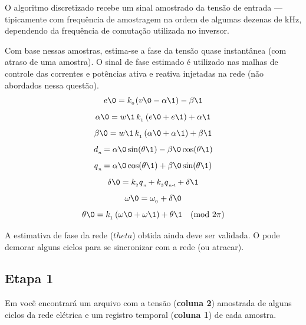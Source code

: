 O algoritmo discretizado recebe um sinal amostrado da tensão de entrada --- tipicamente com frequência de amostragem
na ordem de algumas dezenas de kHz, dependendo da frequência de comutação utilizada no inversor.

Com base nessas amostras, estima-se a fase da tensão quase instantânea (com atraso de uma amostra).
O sinal de fase estimado é utilizado nas malhas de controle das correntes e potências ativa e reativa injetadas na rede
(não abordados nessa questão).
\begin{equation}\label{eq:0}
        e\0 = k_{_0\!} \left( v\0 - \alpha\1 \right)  - \beta\1
\end{equation}
\begin{equation}\label{eq:1}
    \alpha\0 = w\1  \, k_{_1}  \left( e\0 + e\1 \right)  + \alpha\1
\end{equation}
\begin{equation}\label{eq:2}
    \beta\0 = w\1  \, k_{_1}  \left( \alpha\0 + \alpha\1 \right)  + \beta\1
\end{equation}
\begin{equation}\label{eq:3a}
    d{_{_{ n\!}}} =  \alpha\0 \sin(\theta\1) - \beta\0  \cos(\theta\1)
\end{equation}
\begin{equation}\label{eq:3b}
    q{_{_{ n\!}}} =  \alpha\0 \cos(\theta\1) + \beta\0  \sin(\theta\1)
\end{equation}
\begin{equation}\label{eq:4}
    \delta\0 = k_{_2} q{_{_{ n\!}}} + k_{_3} q{_{_{ n\text{-}\!\>\!1\!}}} + \delta\1
\end{equation}
\begin{equation}\label{eq:5}
    \omega\0  = \omega_{_0} + \delta\0
\end{equation}
\begin{equation}\label{eq:6}
    \theta\0 = k_{_1}  \left( \omega\0 + \omega\1 \right)  + \theta\1    \ \ \  (\text{mod}~2\pi)
\end{equation}

A estimativa de fase da rede ($theta$) obtida ainda deve ser validada.
O  pode demorar alguns ciclos para se sincronizar com a rede (ou atracar).


\subsection*{Etapa 1}
Em  você encontrará um
arquivo  com a
tensão (\textbf{coluna 2}) amostrada de alguns ciclos da rede elétrica e um registro temporal (\textbf{coluna 1}) de cada amostra.

